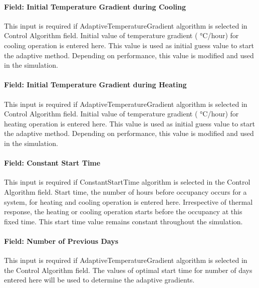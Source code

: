 \paragraph{Field: Initial Temperature Gradient during Cooling}\label{field-initial-temperature-gradient-during-cooling}

This input is required if AdaptiveTemperatureGradient algorithm is selected in Control Algorithm field. Initial value of temperature gradient ( °C/hour) for cooling operation is entered here. This value is used as initial guess value to start the adaptive method. Depending on performance, this value is modified and used in the simulation.

\paragraph{Field: Initial Temperature Gradient during Heating}\label{field-initial-temperature-gradient-during-heating}

This input is required if AdaptiveTemperatureGradient algorithm is selected in Control Algorithm field. Initial value of temperature gradient ( °C/hour) for heating operation is entered here. This value is used as initial guess value to start the adaptive method. Depending on performance, this value is modified and used in the simulation.

\paragraph{Field: Constant Start Time}\label{field-constant-start-time}

This input is required if ConstantStartTime algorithm is selected in the Control Algorithm field. Start time, the number of hours before occupancy occurs for a system, for heating and cooling operation is entered here. Irrespective of thermal response, the heating or cooling operation starts before the occupancy at this fixed time. This start time value remains constant throughout the simulation.

\paragraph{Field: Number of Previous Days}\label{field-number-of-previous-days}

This input is required if AdaptiveTemperatureGradient algorithm is selected in the Control Algorithm field. The values of optimal start time for number of days entered here will be used to determine the adaptive gradients.

